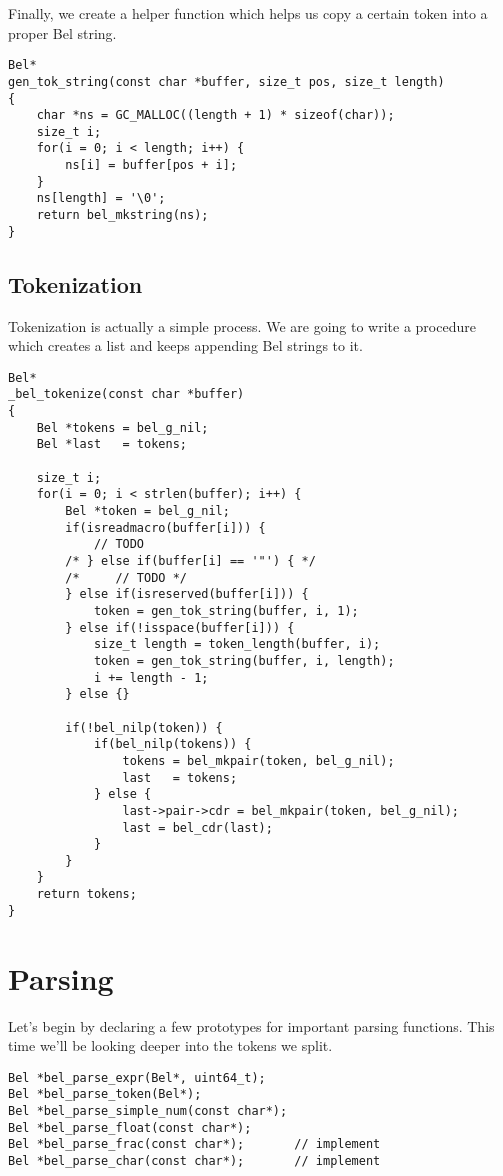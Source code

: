 \documentclass[openright,a4paper,twoside,12pt]{memoir}
\begin{document}
Finally, we  create a helper  function which  helps us copy  a certain
token into a proper Bel string.

\begin{verbatim}
Bel*
gen_tok_string(const char *buffer, size_t pos, size_t length)
{
    char *ns = GC_MALLOC((length + 1) * sizeof(char));
    size_t i;
    for(i = 0; i < length; i++) {
        ns[i] = buffer[pos + i];
    }
    ns[length] = '\0';
    return bel_mkstring(ns);
}
\end{verbatim}

\subsection{Tokenization}
\label{sec:org7fc03fb}

Tokenization is  actually a simple  process. We  are going to  write a
procedure which creates a list and keeps appending Bel strings to it.

\begin{verbatim}
Bel*
_bel_tokenize(const char *buffer)
{
    Bel *tokens = bel_g_nil;
    Bel *last   = tokens;
    
    size_t i;
    for(i = 0; i < strlen(buffer); i++) {
        Bel *token = bel_g_nil;
        if(isreadmacro(buffer[i])) {
            // TODO
        /* } else if(buffer[i] == '"') { */
        /*     // TODO */
        } else if(isreserved(buffer[i])) {
            token = gen_tok_string(buffer, i, 1);
        } else if(!isspace(buffer[i])) {
            size_t length = token_length(buffer, i);
            token = gen_tok_string(buffer, i, length);
            i += length - 1;
        } else {}

        if(!bel_nilp(token)) {
            if(bel_nilp(tokens)) {
                tokens = bel_mkpair(token, bel_g_nil);
                last   = tokens;
            } else {
                last->pair->cdr = bel_mkpair(token, bel_g_nil);
                last = bel_cdr(last);
            }
        }
    }
    return tokens;
}
\end{verbatim}

\section{Parsing}
\label{sec:org2af735f}

Let's  begin  by declaring  a  few  prototypes for  important  parsing
functions. This time we'll be looking deeper into the tokens we split.

\begin{verbatim}
Bel *bel_parse_expr(Bel*, uint64_t);
Bel *bel_parse_token(Bel*);
Bel *bel_parse_simple_num(const char*);
Bel *bel_parse_float(const char*);
Bel *bel_parse_frac(const char*);       // implement
Bel *bel_parse_char(const char*);       // implement
\end{verbatim}
\end{document}
